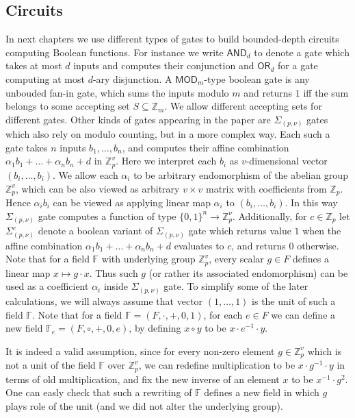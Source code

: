 \documentclass[11pt,a4paper]{amsart}
\renewcommand{\mapsto}{\longmapsto}
\newcounter{note}
\newcommand{\z}{\mathbb{Z}}
\newcommand{\sumpk}[2]{\Sigma_{(#1,#2)}}
\newcommand{\ccand}{\mathsf{AND}}
\newcommand{\ccmod}{\mathsf{MOD}}
\newcommand{\ccor}{\mathsf{OR}}
\begin{document}
\subsection*{Circuits} In next chapters we use different types of gates to build bounded-depth circuits computing Boolean functions. For instance we write $\ccand_{d}$ to denote a gate which takes at most $d$ inputs and computes their conjunction and $\ccor_{d}$ for a gate computing at most $d$-ary disjunction. A $\ccmod_m$-type boolean gate is any unbouded fan-in gate, which sums the inputs modulo $m$ and returns $1$ iff the sum belongs to some accepting set $S\subseteq \z_m$. We allow different accepting sets for different gates. Other kinds of gates appearing in the paper are $\sumpk{p}{\nu}$ gates which also rely on modulo counting, but in a more complex way. Each such a gate takes $n$ inputs $b_1, \ldots, b_n$, and computes their affine combination $\alpha_1 b_1 + \ldots + \alpha_n b_n + d$  in $\z_p^v$. Here we interpret each $b_i$ as $v$-dimensional vector $(b_i, \ldots, b_i)$. We allow each $\alpha_i$ to be arbitrary endomorphism of the abelian group $\z_p^v$, which can be also viewed as arbitrary $v \times v$ matrix with coefficients from $\z_p$. Hence $\alpha_i b_i$ can be viewed as applying linear map $\alpha_i$ to $(b_i, \ldots, b_i)$.  In this way $\sumpk{p}{\nu}$ gate computes a function of type $\{0,1\}^n \rightarrow \z_{p}^{\nu}$. Additionally, for $c\in \z_p$ let $\sumpk{p}{\nu}^c$ denote a boolean variant of $\sumpk{p}{\nu}$ gate which returns value $1$ when the affine combination $\alpha_1 b_1 + \ldots + \alpha_n b_n + d$ evaluates to $c$, and returns $0$ otherwise. Note that for a field $\mathbb{F}$ with underlying group $\z_p^{v}$, every scalar $g \in F$ defines a linear map $x \mapsto g \cdot x$. Thus such $g$ (or rather its associated endomorphism) can be used as a coefficient $\alpha_i$ inside $\sumpk{p}{\nu}$ gate.  To simplify some of the later calculations, we will always assume that vector $(1,\ldots, 1)$ is the unit of such a field $\mathbb{F}$.  Note that for a field $\mathbb{F} = (F, \cdot, +, 0, 1)$, for each $e \in F$ we can define a new field $\mathbb{F}_e = (F, \circ, +, 0, e)$, by defining $x \circ y$ to be $x \cdot e^{-1} \cdot y $. 


It is indeed a valid assumption, since for every  non-zero element $g\in \z_p^{v}$ which is not a unit of the field $\mathbb{F}$ over $\z_p^{v}$, we can redefine multiplication to be $x \cdot g^{-1} \cdot y$ in terms of old multiplication, and fix the new inverse of an element $x$ to be $x^{-1}\cdot g^{2}$. One can easly check that such a rewriting of $\mathbb{F}$ defines a new field in which $g$ plays role of the unit (and we did not alter the underlying group).
\end{document}
